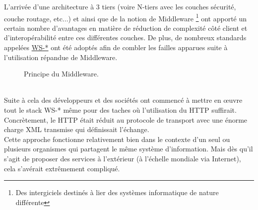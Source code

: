 L'arrivée d'une architecture à 3 tiers (voire N-tiers avec les couches sécurité, couche routage, etc...) et ainsi que de la notion de Middleware \footnote{Des intergiciels destinés à lier des systèmes informatique de nature différente }  ont apporté un certain nombre d'avantages en matière de réduction de complexité côté client et d'interopérabilité entre ces différentes couches. De plus, de nombreux standards appelées \href{https://fr.wikipedia.org/wiki/Liste_des_sp%C3%A9cifications_des_services_web_WS-*}{WS-*} 
	ont été adoptés afin de combler les failles apparues suite à l'utilisation répandue de Middleware. 
	\begin{figure}[h!]
		\centering
		\caption{Principe du Middleware.}
		\label{fig:mainframe}
	\end{figure}
	\\
Suite à cela des développeurs et des sociétés ont commencé à mettre en œuvre tout le stack WS-* même pour des taches où l'utilisation du HTTP suffirait. Concrètement,  le HTTP était réduit au protocole de transport avec une énorme charge XML transmise qui définissait l'échange. 
\\
Cette approche fonctionne relativement bien dans le contexte d'un seul ou plusieurs organismes qui partagent le même système d'information. Mais dès qu'il s'agit de proposer des services à l'extérieur (à l'échelle mondiale via Internet), cela s'avérait extrêmement compliqué. 
\newpage





